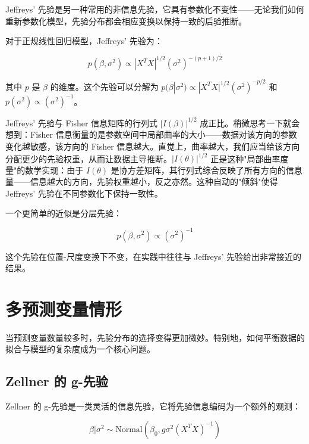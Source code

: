 Jeffreys' 先验是另一种常用的非信息先验，它具有参数化不变性——无论我们如何重新参数化模型，先验分布都会相应变换以保持一致的后验推断。

对于正规线性回归模型，Jeffreys' 先验为：

\begin{equation}
p(\beta, \sigma^2) \propto |X^TX|^{1/2} (\sigma^2)^{-(p+1)/2}
\label{eq:jeffreys-prior-regression}
\end{equation}

其中 $p$ 是 $\beta$ 的维度。这个先验可以分解为 $p(\beta | \sigma^2) \propto |X^TX|^{1/2}(\sigma^2)^{-p/2}$ 和 $p(\sigma^2) \propto (\sigma^2)^{-1}$。

\begin{Remark}
Jeffreys' 先验与 Fisher 信息矩阵的行列式 $|I(\beta)|^{1/2}$ 成正比。稍微思考一下就会想到：Fisher 信息衡量的是参数空间中局部曲率的大小——数据对该方向的参数变化越敏感，该方向的 Fisher 信息越大。直觉上，曲率越大，我们应当给该方向分配更少的先验权重，从而让数据主导推断。$|I(\theta)|^{1/2}$ 正是这种"局部曲率度量"的数学实现：由于 $I(\theta)$ 是协方差矩阵，其行列式综合反映了所有方向的信息量——信息越大的方向，先验权重越小，反之亦然。这种自动的"倾斜"使得 Jeffreys' 先验在不同参数化下保持一致性。
\end{Remark}

一个更简单的近似是分层先验：

\begin{equation}
p(\beta, \sigma^2) \propto (\sigma^2)^{-1}
\label{eq:scale-invariant-prior}
\end{equation}

这个先验在位置-尺度变换下不变，在实践中往往与 Jeffreys' 先验给出非常接近的结果。

\section{多预测变量情形}

当预测变量数量较多时，先验分布的选择变得更加微妙。特别地，如何平衡数据的拟合与模型的复杂度成为一个核心问题。

\subsection{Zellner 的 g-先验}

Zellner 的 g-先验是一类灵活的信息先验，它将先验信息编码为一个额外的观测：

\begin{equation}
\beta | \sigma^2 \sim \text{Normal}(\beta_0, g\sigma^2(X^TX)^{-1})
\label{eq:zellner-g-prior}
\end{equation}

